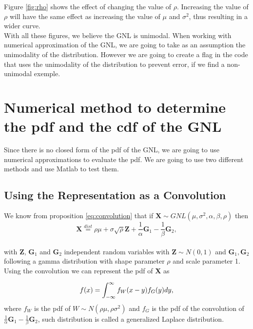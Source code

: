 \documentclass[12pt,travaildirige,nobabel, twoside]{dms}
\numberwithin{equation}{section}
\numberwithin{table}{chapter}
\numberwithin{figure}{chapter}
\begin{document}
Figure \ref{fig:rho} shows the effect of changing the value of $\rho$. Increasing the value of $\rho$ will have the same effect as increasing the value of $\mu$ and $\sigma^2$, thus resulting in a wider curve.\\

With all these figures, we believe the GNL is unimodal. When working with numerical approximation of the GNL, we are going to take as an assumption the unimodality of the distribution. However we are going to create a flag in the code that uses the unimodality of the distribution to prevent error, if we find a non-unimodal exemple.  
\clearpage

\section{Numerical method to determine the pdf and the cdf of the GNL}

Since there is no closed form of the pdf of the GNL, we are going to use numerical approximations to evaluate the pdf. We are going to use two different methods and use Matlab to test them.

\subsection{Using the Representation as a Convolution}
We know from proposition \ref{eq:convolution} that if \begin{math}\textbf{X}\sim GNL( \mu,\sigma^2,\alpha, \beta,\rho)\end{math} then \\
\begin{equation} 
\textbf{X}\stackrel{dist}{=}\rho\mu + \sigma\sqrt{\rho}\textbf{Z}+\frac{1}{\alpha}\textbf{G}_1-\frac{1}{\beta}\textbf{G}_2, 
\end{equation}\\ with \textbf{Z}, $\textbf{G}_1$ and $\textbf{G}_2$  independent random variables with $\textbf{Z}\sim N(0,1)$ and $\textbf{G}_1,\textbf{G}_2$ following a gamma distribution with shape parameter $\rho$ and scale parameter 1.\\

Using the convolution we can represent the pdf of \textbf{X} as

\begin{equation}
f(x)=\int_{-\infty}^{\infty}f_W(x-y)f_G(y)dy \text{\nocite{rigprob},}
\end{equation}
where $f_W$ is the pdf of  $W\sim N(\rho \mu,\rho\sigma^2)$ and $f_G$ is the pdf of the convolution of $\frac{1}{\alpha}\textbf{G}_1-\frac{1}{\beta}\textbf{G}_2$, such distribution is called a generalized Laplace distribution\citep{appGNL}.\\
\end{document}
